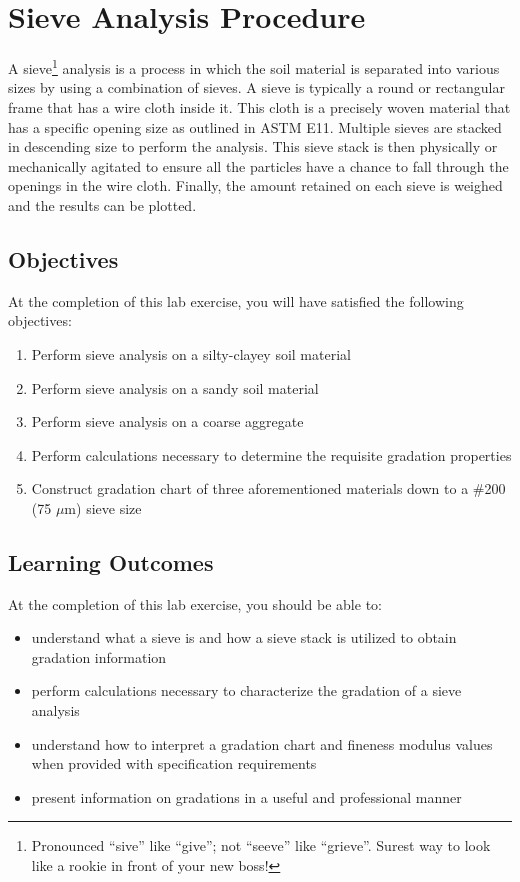 \documentclass[12pt]{article}
\begin{document}
\section{Sieve Analysis Procedure}
\label{sec:intro}
\normalsize 
A sieve\footnote{Pronounced ``sive'' like ``give''; not ``seeve'' like ``grieve''. Surest way to look like a rookie in front of your new boss!} analysis is a process in which the soil material is separated into various sizes by using a combination of sieves. A sieve is typically a round or rectangular frame that has a wire cloth inside it. This cloth is a precisely woven material that has a specific opening size as outlined in ASTM E11. Multiple sieves are stacked in descending size to perform the analysis. This sieve stack is then physically or mechanically agitated to ensure all the particles have a chance to fall through the openings in the wire cloth. Finally, the amount retained on each sieve is weighed and the results can be plotted.

\subsection{Objectives}
\label{ssec:headingscap}
At the completion of this lab exercise, you will have satisfied the following objectives:
\begin{enumerate}
    \item Perform sieve analysis on a silty-clayey soil material
    \item Perform sieve analysis on a sandy soil material
    \item Perform sieve analysis on a coarse aggregate
    \item Perform calculations necessary to determine the requisite gradation properties
    \item Construct gradation chart of three aforementioned materials down to a \#200 (75 $\mu$m) sieve size
\end{enumerate}

\subsection{Learning Outcomes}
At the completion of this lab exercise, you should be able to:
\begin{itemize}
    \item understand what a sieve is and how a sieve stack is utilized to obtain gradation information
    \item perform calculations necessary to characterize the gradation of a sieve analysis
    \item understand how to interpret a gradation chart and fineness modulus values when provided with specification requirements
    \item present information on gradations in a useful and professional manner
\end{itemize}
\end{document}
